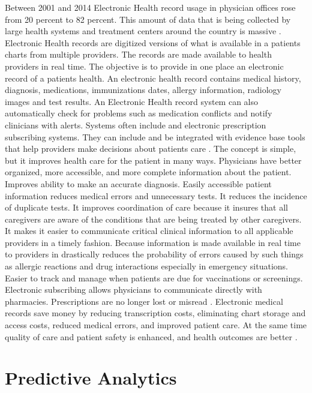 \documentclass[sigconf]{acmart}
\begin{document}
Between 2001 and 2014 Electronic Health record usage in physician offices rose from 20 percent to 82 percent. This amount of data that is being collected by large health systems and treatment centers around the country is massive \cite{www-google-pred}. 
Electronic Health records are digitized versions of what is available in a patients charts from multiple providers. The records are made available to health providers in real time. The objective is to provide in one place an electronic record of a patients health. An electronic health record contains medical history, diagnosis, medications, immunizations dates, allergy information, radiology images and test results.  An Electronic Health record system can also automatically check for problems such as medication conflicts and notify clinicians with alerts. Systems often include and electronic prescription subscribing systems. They can include and be integrated with evidence base tools that help providers make decisions about patients care \cite{www-google-elec}.  
The concept is simple, but it improves health care for the patient in many ways. Physicians have better organized, more accessible, and more complete information about the patient.  Improves ability to make an accurate diagnosis.  Easily accessible patient information reduces medical errors and unnecessary tests. It reduces the incidence of duplicate tests. It improves coordination of care because it insures that all caregivers are aware of the conditions that are being treated by other caregivers. It makes it easier to communicate critical clinical information to all applicable providers in a timely fashion. Because information is made available in real time to providers in drastically reduces the probability of errors caused by such things as allergic reactions and drug interactions especially in emergency situations.  Easier to track and manage when patients are due for vaccinations or screenings. Electronic subscribing allows physicians to communicate directly with pharmacies. Prescriptions are no longer lost or misread \cite{www-google-elec}.
Electronic medical records save money by reducing transcription costs, eliminating chart storage and access costs, reduced medical errors, and improved patient care. At the same time quality of care and patient safety is enhanced, and health outcomes are better \cite{www-google-elec}. 




\section{Predictive Analytics}
\end{document}
